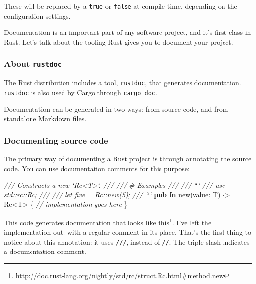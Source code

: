 \documentclass[a4paper,]{book}
\newenvironment{Shaded}{\begin{snugshade}}{\end{snugshade}}
\newcommand{\KeywordTok}[1]{\textcolor[rgb]{0.13,0.29,0.53}{\textbf{{#1}}}}
\newcommand{\CommentTok}[1]{\textcolor[rgb]{0.56,0.35,0.01}{\textit{{#1}}}}
\newcommand{\NormalTok}[1]{{#1}}
\renewcommand{\href}[2]{#2\footnote{\url{#1}}}
\begin{document}
These will be replaced by a \texttt{true} or \texttt{false} at
compile-time, depending on the configuration settings.


Documentation is an important part of any software project, and it's
first-class in Rust. Let's talk about the tooling Rust gives you to
document your project.

\subsubsection{\texorpdfstring{About
\texttt{rustdoc}}{About rustdoc}}\label{about-rustdoc}

The Rust distribution includes a tool, \texttt{rustdoc}, that generates
documentation. \texttt{rustdoc} is also used by Cargo through
\texttt{cargo\ doc}.

Documentation can be generated in two ways: from source code, and from
standalone Markdown files.

\subsubsection{Documenting source code}\label{documenting-source-code}

The primary way of documenting a Rust project is through annotating the
source code. You can use documentation comments for this purpose:

\begin{Shaded}
\begin{Highlighting}[]
\CommentTok{/// Constructs a new `Rc<T>`.}
\CommentTok{///}
\CommentTok{/// # Examples}
\CommentTok{///}
\CommentTok{/// ```}
\CommentTok{/// use std::rc::Rc;}
\CommentTok{///}
\CommentTok{/// let five = Rc::new(5);}
\CommentTok{/// ```}
\KeywordTok{pub} \KeywordTok{fn} \NormalTok{new(value: T) -> Rc<T> \{}
    \CommentTok{// implementation goes here}
\NormalTok{\}}
\end{Highlighting}
\end{Shaded}

This code generates documentation that looks
\href{http://doc.rust-lang.org/nightly/std/rc/struct.Rc.html\#method.new}{like
this}. I've left the implementation out, with a regular comment in its
place. That's the first thing to notice about this annotation: it uses
\texttt{///}, instead of \texttt{//}. The triple slash indicates a
documentation comment.
\end{document}
